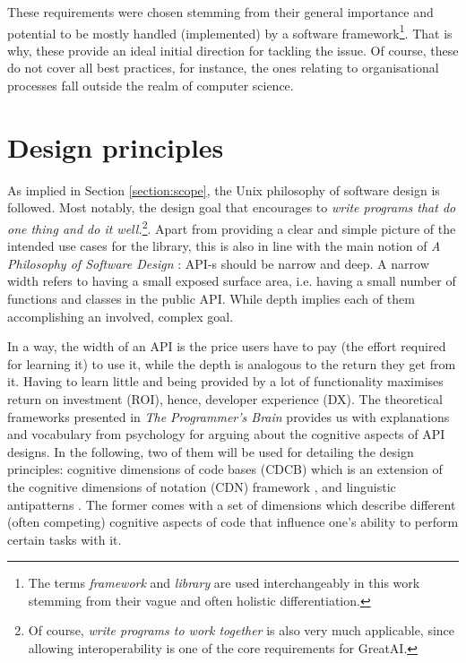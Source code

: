 These requirements were chosen stemming from their general importance and potential to be mostly handled (implemented) by a software framework\footnote{The terms \textit{framework} and \textit{library} are used interchangeably in this work stemming from their vague and often holistic differentiation.}. That is why, these provide an ideal initial direction for tackling the issue. Of course, these do not cover all best practices, for instance, the ones relating to organisational processes fall outside the realm of computer science.

\section{Design principles}

As implied in Section \ref{section:scope}, the Unix philosophy \cite{ritchie1978unix,salus1994quarter} of software design is followed. Most notably, the design goal that encourages to \textit{write programs that do one thing and do it well.}\footnote{Of course, \textit{write programs to work together} is also very much applicable, since allowing interoperability is one of the core requirements for GreatAI.}. Apart from providing a clear and simple picture of the intended use cases for the library, this is also in line with the main notion of \textit{A Philosophy of Software Design} \cite{ousterhout2018philosophy}: API-s should be narrow and deep. A narrow width refers to having a small exposed surface area, i.e. having a small number of functions and classes in the public API. While depth implies each of them accomplishing an involved, complex goal. 

In a way, the width of an API is the price users have to pay (the effort required for learning it) to use it, while the depth is analogous to the return they get from it. Having to learn little and being provided by a lot of functionality maximises return on investment (ROI), hence, developer experience (DX). The theoretical frameworks presented in \textit{The Programmer's Brain} \cite{hermans2021programmer} provides us with explanations and vocabulary from psychology for arguing about the cognitive aspects of API designs. In the following, two of them will be used for detailing the design principles: cognitive dimensions of code bases (CDCB) which is an extension of the cognitive dimensions of notation (CDN) framework \cite{blackwell2001cognitive}, and linguistic antipatterns \cite{arnaoudova2016linguistic}. The former comes with a set of dimensions which describe different (often competing) cognitive aspects of code that influence one's ability to perform certain tasks with it.

